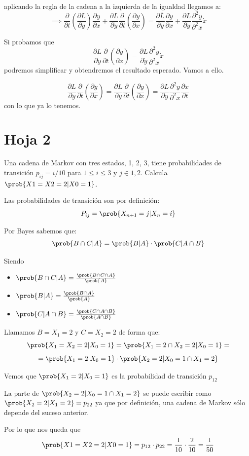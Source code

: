 \begin{problem}[15]
aplicando la regla de la cadena a la izquierda de la igualdad llegamos a:
\[\implies \frac{\partial}{\partial t} \left( \frac{\partial L}{\partial \dot y}\right)\frac{\partial y}{\partial x} + \frac{\partial L}{\partial \dot y}\frac{\partial}{\partial t} \left( \frac{\partial y}{\partial x}\right) = \frac{\partial \bar{L}}{\partial y}\frac{\partial y}{\partial x}+\frac{\partial L}{\partial \dot y}\frac{\partial^2 y}{\partial^2 x}\dot x\]

Si probamos que
\[\frac{\partial L}{\partial \dot y}\frac{\partial}{\partial t} \left( \frac{\partial y}{\partial x}\right) = \frac{\partial L}{\partial \dot y}\frac{\partial^2 y}{\partial^2 x}\dot x\]
podremos simplificar y obtendremos el resultado esperado. Vamos a ello.

\[\frac{\partial L}{\partial \dot y}\frac{\partial}{\partial t} \left( \frac{\partial y}{\partial x}\right) = \frac{\partial L}{\partial \dot y}\frac{\partial}{\partial t} \left( \frac{\partial y}{\partial x}\right) = \frac{\partial L}{\partial \dot y}\frac{\partial^2 y}{\partial^2 x}\frac{\partial x}{\partial t}\]
con lo que ya lo tenemos.

\end{problem}

\section{Hoja 2}

\begin{problem}[1]
	Una cadena de Markov con tres estados, {1, 2, 3}, tiene probabilidades de transición
	$p_{ij} = i/10$ para $1 ≤ i ≤ 3$ y $j ∈ {1, 2}$. Calcula $\prob{X1 = X2 = 2|X0 = 1}$.

	\solution
	Las probabilidades de transición son por definición:
	$$P_{ij} = \prob{X_{n+1} = j | X_n = i}$$

	Por Bayes sabemos que:
	$$\prob{B\cap C|A} = \prob{B|A} \cdot \prob{C|A\cap B}$$

	Siendo
	\begin{itemize}
		\item 	$\prob{B\cap C|A} = \frac{\prob{B\cap C \cap A}}{\prob{A}}$
		\item  $ \prob{B|A} = \frac{\prob{B\cap A}}{\prob{A}}$
		\item  $\prob{C|A\cap B}= \frac{\prob{C\cap A \cap B}}{\prob{A\cap B}}$
	\end{itemize}

	Llamamos $B={X_1 = 2}$ y $C={X_2 = 2}$ de forma que:
	\[\prob{X_1 = X_2 = 2|X_0 = 1} = \prob{X_1 = 2 \cap X_2 = 2|X_0 = 1} =\]
	\[= \prob{X_1=2|X_0=1} \cdot \prob{X_2 =2 |X_0 = 1 \cap X_1 =2}\]

	Vemos que $\prob{X_1=2|X_0=1}$ es la probabilidad de transición $p_{12}$

	La parte de $\prob{X_2 =2 |X_0 = 1 \cap X_1 =2}$ se puede escribir como $\prob{X_2 =2 | X_1 =2} = p_{22}$ ya que por definición, una cadena de Markov sólo depende del suceso anterior.

	Por lo que nos queda que
	$$\prob{X1 = X2 = 2|X0 = 1} = p_{12} \cdot p_{22} = \frac{1}{10} \cdot \frac{2}{10} = \frac{1}{50}$$
\end{problem}




